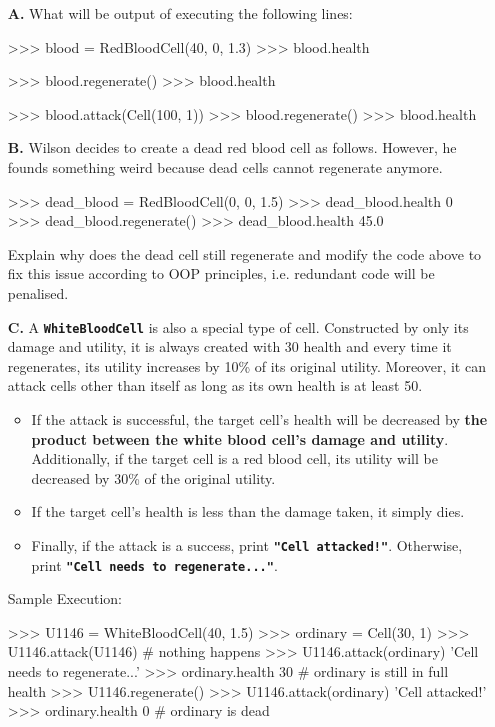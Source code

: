 \begin{enumerate}
\item[\textbf{A.}]
What will be output of executing the following lines:
\begin{python}
>>> blood = RedBloodCell(40, 0, 1.3)
>>> blood.health

>>> blood.regenerate()
>>> blood.health

>>> blood.attack(Cell(100, 1))
>>> blood.regenerate()
>>> blood.health
\end{python}
\begin{flushright}
    [2 marks]
\end{flushright}

\item[\textbf{B.}]
Wilson decides to create a dead red blood cell as follows. However, he founds something weird because dead cells cannot regenerate anymore.
\begin{python}
>>> dead_blood = RedBloodCell(0, 0, 1.5)
>>> dead_blood.health
0
>>> dead_blood.regenerate()
>>> dead_blood.health
45.0
\end{python}
Explain why does the dead cell still regenerate and modify the code above to fix this issue according to OOP principles, i.e. 
redundant code will be penalised.
\begin{flushright}
    [4 marks]
\end{flushright}

\item[\textbf{C.}]
A \colorbox{CornflowerBlue!20}{\texttt{\textbf{WhiteBloodCell}}} is also a special type of cell. Constructed by only its damage and utility, it is always created 
with 30 health and every time it regenerates, its utility increases by 10\% of its original utility. Moreover, it can attack cells other than itself as long as 
its own health is at least 50.
\begin{itemize}
\item If the attack is successful, the target cell's health will be decreased by \textbf{the product between the white blood cell's damage and utility}. Additionally, 
if the target cell is a red blood cell, its utility will be decreased by 30\% of the original utility.
\item If the target cell's health is less than the damage taken, it simply dies.
\item Finally, if the attack is a success, print \texttt{\bfseries "Cell attacked!"}. Otherwise, print \texttt{\bfseries "Cell needs to regenerate..."}.
\end{itemize}
Sample Execution:
\begin{python}
>>> U1146 = WhiteBloodCell(40, 1.5)
>>> ordinary = Cell(30, 1)
>>> U1146.attack(U1146)     # nothing happens
>>> U1146.attack(ordinary)
'Cell needs to regenerate...'
>>> ordinary.health
30                          # ordinary is still in full health
>>> U1146.regenerate()
>>> U1146.attack(ordinary)
'Cell attacked!'
>>> ordinary.health
0                           # ordinary is dead


\end{python}
\end{enumerate}

